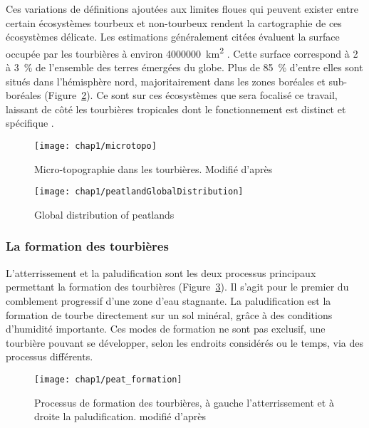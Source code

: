 Ces variations de définitions ajoutées aux limites floues qui peuvent exister entre certain écosystèmes tourbeux et non-tourbeux rendent la cartographie de ces écosystèmes délicate.
Les estimations généralement citées évaluent la surface occupée par les tourbières à environ \SI{4000000}{\square\kilo\meter} \citep{lappalainen1996}. 
Cette surface correspond à \num{2} à \SI{3}{\percent} de l'ensemble des terres émergées du globe.
Plus de \SI{85}{\percent} d'entre elles sont situés dans l'hémisphère nord, majoritairement dans les zones boréales et sub-boréales \citep{strack2008} (Figure~\ref{fig:peatlandGlobalDistribution}).
Ce sont sur ces écosystèmes que sera focalisé ce travail, laissant de côté les tourbières tropicales dont le fonctionnement est distinct et spécifique \plop.

\begin{figure}[t]
\centering
\texttt{[image: chap1/microtopo]}
\caption{Micro-topographie dans les tourbières. Modifié d'après \citet{rydin2013a}}
\label{fig:microtopo}
\end{figure}

\begin{figure}
\centering
\texttt{[image: chap1/peatlandGlobalDistribution]}
\caption{Global distribution of peatlands}
\label{fig:peatlandGlobalDistribution} 
\end{figure}

\subsubsection{La formation des tourbières}
L'atterrissement et la paludification sont les deux processus principaux permettant la formation des tourbières (Figure~\ref{fig:peat_formation}).
Il s'agit pour le premier du comblement progressif d'une zone d'eau stagnante.
La paludification est la formation de tourbe directement sur un sol minéral, grâce à des conditions d'humidité importante.
Ces modes de formation ne sont pas exclusif, une tourbière pouvant se développer, selon les endroits considérés ou le temps, via des processus différents.

\begin{figure}
\centering
\texttt{[image: chap1/peat\_formation]}
\caption{Processus de formation des tourbières, à gauche l'atterrissement et à droite la paludification. modifié d'après \citet{manneville1999}}
\label{fig:peat_formation}
\end{figure}

